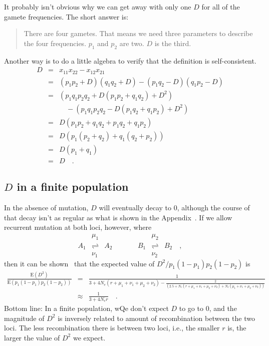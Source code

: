 \documentclass[12pt]{article}
\begin{document}
It probably isn't obvious why we can get away with only one $D$ for
all of the gamete frequencies. The short answer is:
\begin{quote}There are four gametes. That means we need three
  parameters to describe the four frequencies. $p_1$ and $p_2$ are
  two. $D$ is the third.
\end{quote}
Another way is to do a little algebra to verify that the definition is
self-consistent.
\begin{eqnarray*}
D &=& x_{11}x_{22} - x_{12}x_{21} \\
  &=& (p_1p_2 + D)(q_1q_2 + D) - (p_1q_2 - D)(q_1p_2 - D) \\
  &=& \left(p_1q_1p_2q_2 + D(p_1p_2 + q_1q_2) + D^2\right) \\
  && \quad - \left(p_1q_1p_2q_2 - D(p_1q_2 + q_1p_2) + D^2\right) \\
  &=& D(p_1p_2 + q_1q_2 + p_1q_2 + q_1p_2) \\
  &=& D\left(p_1(p_2 + q_2) + q_1(q_2 + p_2)\right) \\
  &=& D(p_1 + q_1) \\
  &=& D \quad.
\end{eqnarray*}

\subsection*{$D$ in a finite population}

In the absence of mutation, $D$ will eventually decay to 0, although
the course of that decay isn't as regular as what is shown in the
Appendix~\cite{Hill-Robertson-1968}. If we allow recurrent mutation at
both loci, however, where
\[
\begin{array}{ccccccc}
    &\mu_1            &     &      &     &\mu_2 \\
A_1 &\rightleftharpoons& A_2 &\qquad& B_1 &\rightleftharpoons& B_2
\quad , \\
    &\nu_1            &     &      &     &\nu_2
\end{array}
\]
then it can be shown~\cite{Ohta-Kimura-1969} that the expected value
of $D^2/p_1(1-p_1)p_2(1-p_2)$ is
{\scriptsize
\begin{eqnarray*}
\frac{\mbox{E}(D^2)}{\mbox{E}(p_1(1-p_1)p_2(1-p_2))}
&=& \frac{1}{3 + 4N_e(r+\mu_1+\nu_1+\mu_2+\nu_2)
                           - \frac{2}{(2.5 + N_e(r+\mu_1+\nu_1+\mu_2+\nu_2)
                              + N_e(\mu_1+\nu_1+\mu_2+\nu_2))}} \\
&\approx& \frac{1}{3 + 4N_er} \quad .
\end{eqnarray*}}
Bottom line: In a finite population, wQe don't expect $D$ to go to 0,
and the magnitude of $D^2$ is inversely related to amount of
recombination between the two loci. The less recombination there is
between two loci, i.e., the smaller $r$ is, the larger the value of
$D^2$ we expect.
\end{document}
